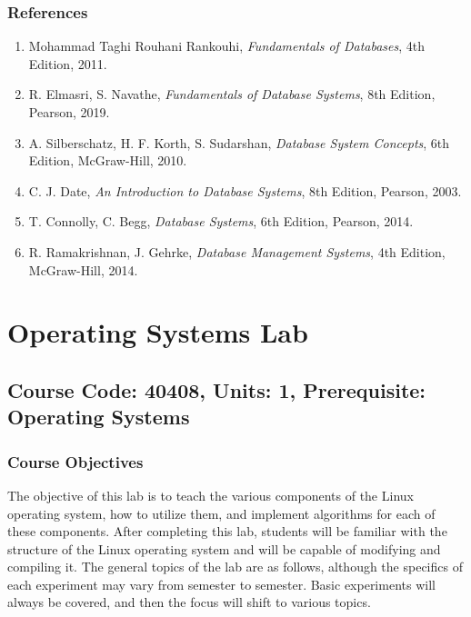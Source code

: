 \documentclass[12pt]{article}
\begin{document}
\subsubsection*{References}
\begin{enumerate}
    \item Mohammad Taghi Rouhani Rankouhi, \textit{Fundamentals of Databases}, 4th Edition, 2011.
    \item R. Elmasri, S. Navathe, \textit{Fundamentals of Database Systems}, 8th Edition, Pearson, 2019.
    \item A. Silberschatz, H. F. Korth, S. Sudarshan, \textit{Database System Concepts}, 6th Edition, McGraw-Hill, 2010.
    \item C. J. Date, \textit{An Introduction to Database Systems}, 8th Edition, Pearson, 2003.
    \item T. Connolly, C. Begg, \textit{Database Systems}, 6th Edition, Pearson, 2014.
    \item R. Ramakrishnan, J. Gehrke, \textit{Database Management Systems}, 4th Edition, McGraw-Hill, 2014.
\end{enumerate}

\newpage

\section{Operating Systems Lab}
\subsection*{Course Code: 40408, Units: 1, Prerequisite: Operating Systems}

\subsubsection*{Course Objectives}
The objective of this lab is to teach the various components of the Linux operating system, how to utilize them, and implement algorithms for each of these components. After completing this lab, students will be familiar with the structure of the Linux operating system and will be capable of modifying and compiling it. The general topics of the lab are as follows, although the specifics of each experiment may vary from semester to semester. Basic experiments will always be covered, and then the focus will shift to various topics.
\end{document}
